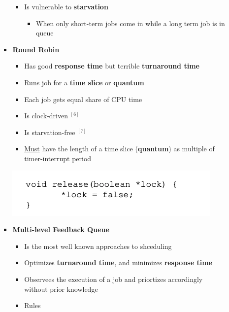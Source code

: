 \documentclass[12pt]{article}
\begin{document}
\begin{enumerate}[1.]
\begin{enumerate}[a)]
\begin{itemize}
\begin{itemize}
                \item Is vulnerable to \textbf{starvation}
                \begin{itemize}
                    \item When only short-term jobs come in while a long term job is in queue
                \end{itemize}

            \end{itemize}

            \item \textbf{Round Robin}

            \begin{itemize}
                \item Has good \textbf{response time} but terrible \textbf{turnaround time}
                \item Runs job for a \textbf{time slice} or \textbf{quantum}
                \item Each job gets equal share of CPU time
                \item Is clock-driven $^{[6]}$
                \item Is starvation-free $^{[7]}$
                \item \underline{Must} have the length of a time slice (\textbf{quantum}) as multiple of timer-interrupt period
            \end{itemize}

            \bigskip

            \begin{center}
            \includegraphics[width=0.7\linewidth]{images/midterm_2_solution_4.png}
            \end{center}
            \item \textbf{Multi-level Feedback Queue}

            \begin{itemize}
                \item Is the most well known approaches to shceduling
                \item Optimizes \textbf{turnaround time}, and minimizes \textbf{response time}
                \item Observees the execution of a job and priortizes accordingly without prior knowledge
                \item Rules


\end{itemize}
\end{itemize}
\end{enumerate}
\end{enumerate}
\end{document}
